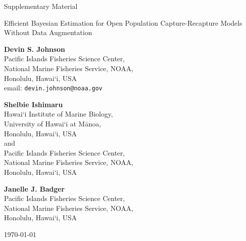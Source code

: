 \documentclass[12pt]{article}
\begin{document}

\vspace*{1in}

\setlength{\parindent}{0pt}
\renewcommand{\baselinestretch}{1.8}\normalsize

\begin{center}

Supplementary Material

\noindent\hrulefill

{\Large Efficient Bayesian Estimation for Open Population Capture-Recapture Models Without Data Augmentation} 

\noindent\hrulefill

\end{center}

\renewcommand{\baselinestretch}{1.15}\normalsize 
\bigskip

\begin{center}
{\bf Devin S. Johnson}\\
 Pacific Islands Fisheries Science Center,\\
 National Marine Fisheries Service, NOAA, \\
 Honolulu, Hawai`i, USA \\
 email: {\tt devin.johnson@noaa.gov} \\ \bigskip
 
 {\bf Shelbie Ishimaru} \\
Hawai`i Institute of Marine Biology, \\
University of Hawai`i at Mānoa, \\
Honolulu, Hawai`i, USA\\ 
and \\
Pacific Islands Fisheries Science Center,\\
National Marine Fisheries Service, NOAA, \\
Honolulu, Hawai`i, USA \\  \bigskip

{\bf Janelle J. Badger} \\
 Pacific Islands Fisheries Science Center,\\
 National Marine Fisheries Service, NOAA, \\
 Honolulu, Hawai`i, USA \\ \bigskip

\bigskip

\today

\end{center}
\end{document}
